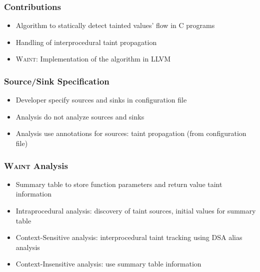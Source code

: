 \documentclass[xcolor=dvipsnames]{beamer}
\newcommand{\waint}{\textsc{Waint}\xspace}
\begin{document}
\begin{frame}
  \frametitle{Contributions} 
	{\large
	\begin{itemize}
	\item Algorithm to statically detect tainted values' flow in C programs
   	\vspace{0.5cm}
	\item Handling of interprocedural taint propagation
   	\vspace{0.5cm}   	
	\item \waint: Implementation of the algorithm in LLVM
	\end{itemize}
	}
\end{frame}

\begin{frame}
  \frametitle{Source/Sink Specification} 
    {\large
	\begin{itemize}
	\item Developer specify sources and sinks in configuration file
   	\vspace{0.5cm}	
   	\item Analysis do not analyze sources and sinks
   	\vspace{0.5cm}	     	   		   	
   	\item Analysis use annotations for sources: taint propagation (from configuration file)
   	\end{itemize}
	}
\end{frame}

\begin{frame}
  \frametitle{\waint Analysis} 
	{\large
	\begin{itemize}	
   	\item Summary table to store function parameters and return value taint information
   	\vspace{0.5cm}   	
	\item Intraprocedural analysis: discovery of taint sources, initial values
	for summary table
   	\vspace{0.5cm}	   	
	\item Context-Sensitive analysis: interprocedural taint tracking using
	DSA alias analysis
   	\vspace{0.5cm}		   	
	\item Context-Insensitive analysis: use summary table information
	\end{itemize}
}
\end{frame}
\end{document}
